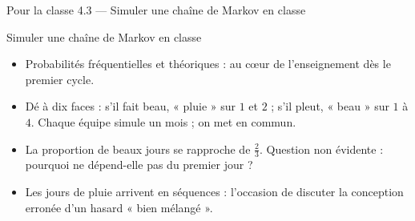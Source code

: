 \begin{frame}{Pour la classe 4.3 --- Simuler une chaîne de Markov en classe}
  \begin{Classe}{Simuler une chaîne de Markov en classe}
    \small
    \begin{itemize}
      \item Probabilités fréquentielles et théoriques : au cœur de
        l'enseignement dès le premier cycle.
      \item Dé à dix faces : s'il fait beau, « pluie » sur $1$ et $2$ ;
        s'il pleut, « beau » sur $1$ à $4$. Chaque équipe simule un mois ;
        on met en commun.
      \item La proportion de beaux jours se rapproche de $\tfrac23$.
        Question non évidente : pourquoi ne dépend-elle pas du premier
        jour ?
      \item Les jours de pluie arrivent en séquences : l'occasion de
        discuter la conception erronée d'un hasard « bien mélangé ».
    \end{itemize}
  \end{Classe}
\end{frame}
